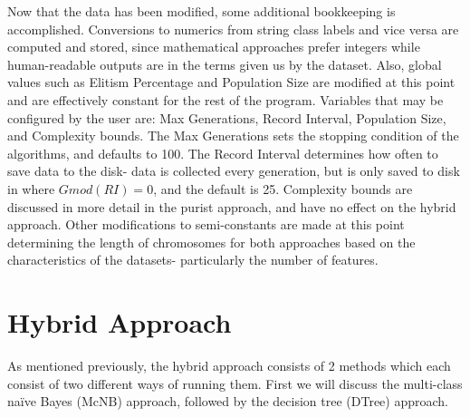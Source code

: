 Now that the data has been modified, some additional bookkeeping is accomplished.  Conversions to numerics from string class labels and vice versa are computed and stored, since mathematical approaches prefer integers while human-readable outputs are in the terms given us by the dataset.  Also, global values such as Elitism Percentage and Population Size are modified at this point and are effectively constant for the rest of the program.  Variables that may be configured by the user are: Max Generations, Record Interval, Population Size, and Complexity bounds.  The Max Generations sets the stopping condition of the algorithms, and defaults to 100.  The Record Interval determines how often to save data to the disk- data is collected every generation, but is only saved to disk in where $G mod(RI) = 0$, and the default is 25.  Complexity bounds are discussed in more detail in the purist approach, and have no effect on the hybrid approach.  Other modifications to semi-constants are made at this point determining the length of chromosomes for both approaches based on the characteristics of the datasets- particularly the number of features.
\section{Hybrid Approach}
As mentioned previously, the hybrid approach consists of 2 methods which each consist of two different ways of running them.  First we will discuss the multi-class na\"ive Bayes (McNB) approach, followed by the decision tree (DTree) approach.
